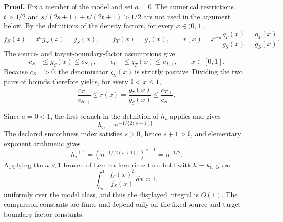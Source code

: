 \textbf{Proof.}
Fix a member of the model and set \(a=0\).  The numerical restrictions \(t>1/2\) and
\(s/(2s+1)+t/(2t+1)>1/2\) are not used in the argument below.  By the definitions of
the density factors, for every \(x\in(0,1]\),
\[
 f_S(x)=x^a g_S(x)=g_S(x),
 \qquad
 f_T(x)=g_T(x),
 \qquad
 r(x)=x^{-a}\frac{g_T(x)}{g_S(x)}=\frac{g_T(x)}{g_S(x)}.
\]
The source- and target-boundary-factor assumptions give
\[
 c_{S,-}\le g_S(x)\le c_{S,+},
 \qquad
 c_{T,-}\le g_T(x)\le c_{T,+},
 \qquad x\in[0,1].
\]
Because \(c_{S,-}>0\), the denominator \(g_S(x)\) is strictly positive.  Dividing the
two pairs of bounds therefore yields, for every \(0<x\le1\),
\[
 \frac{c_{T,-}}{c_{S,+}}
 \le r(x)=\frac{g_T(x)}{g_S(x)}
 \le \frac{c_{T,+}}{c_{S,-}}.
\]

Since \(a=0<1\), the first branch in the definition of \(h_n\) applies and gives
\[
 h_n=n^{-1/\{2(s+1)\}}.
\]
The declared smoothness index satisfies \(s>0\), hence \(s+1>0\), and elementary
exponent arithmetic gives
\[
 h_n^{s+1}
 =\left(n^{-1/\{2(s+1)\}}\right)^{s+1}
 =n^{-1/2}.
\]
Applying the \(a<1\) branch of Lemma \(\mathrm{lem:riesz\text{-}threshold}\) with
\(h=h_n\) gives
\[
 \int_{h_n}^1\frac{f_T(x)^2}{f_S(x)}\,dx\asymp1,
\]
uniformly over the model class, and thus the displayed integral is \(O(1)\).  The
comparison constants are finite and depend only on the fixed source and target
boundary-factor constants.

